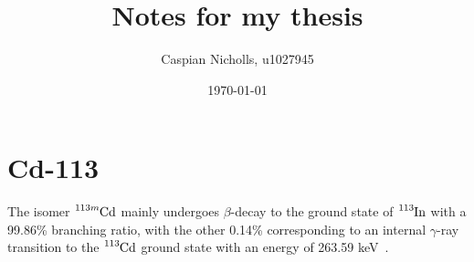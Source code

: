 \documentclass{article}
\begin{document}
\title{Notes for my thesis}
\author{Caspian Nicholls, u1027945}
\date{\today}

\maketitle

\section*{Cd-113}

\medskip
\noindent
The isomer $\ce{^{113m}Cd}$ mainly undergoes $\beta$-decay to the ground state of $\ce{^{113}In}$ with a 99.86\% branching ratio, with the other 0.14\% corresponding to an internal $\gamma$-ray transition to the $\ce{^{113}Cd}$ ground state with an energy of 263.59 keV~\cite{hayakawa_neutron_2009}.



\vspace*{-\baselineskip}

{}
\end{document}
